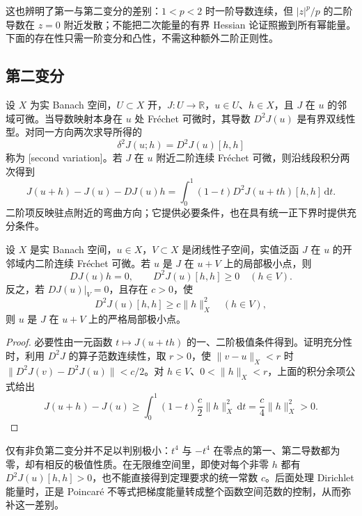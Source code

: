 这也辨明了第一与第二变分的差别：\(1<p<2\) 时一阶导数连续，但 \(|z|^p/p\) 的二阶导数在 \(z=0\) 附近发散；不能把二次能量的有界 Hessian 论证照搬到所有幂能量。下面的存在性只需一阶变分和凸性，不需这种额外二阶正则性。

\subsection{第二变分}
\label{b2:subsec:140104}

设 \(X\) 为实 Banach 空间，\(U\subset X\) 开，\(J:U\to\mathbb R\)，\(u\in U\)、\(h\in X\)，且 \(J\) 在 \(u\) 的邻域可微。当导数映射本身在 \(u\) 处 Fréchet 可微时，其导数 \(D^2J(u)\) 是有界双线性型。对同一方向两次求导所得的
\[\delta^2J(u;h)=D^2J(u)[h,h]\]
称为 [second variation]。若 \(J\) 在 \(u\) 附近二阶连续 Fréchet 可微，则沿线段积分两次得到
\[
 J(u+h)-J(u)-DJ(u)h
 =\int_0^1(1-t)D^2J(u+th)[h,h]\,\mathrm dt.
\]
二阶项反映驻点附近的弯曲方向；它提供必要条件，也在具有统一正下界时提供充分条件。

\begin{theorem}[第二变分判别]
\label{b2:thm:14-second-variation-test}
设 \(X\) 是实 Banach 空间，\(u\in X\)，\(V\subset X\) 是闭线性子空间，实值泛函 \(J\) 在 \(u\) 的开邻域内二阶连续 Fréchet 可微。若 \(u\) 是 \(J\) 在 \(u+V\) 上的局部极小点，则
\[DJ(u)h=0,\qquad D^2J(u)[h,h]\ge0\quad(h\in V).\]
反之，若 \(DJ(u)|_V=0\)，且存在 \(c>0\)，使
\[D^2J(u)[h,h]\ge c\lVert h\rVert_X^2\quad(h\in V),\]
则 \(u\) 是 \(J\) 在 \(u+V\) 上的严格局部极小点。
\end{theorem}
\begin{proof}
必要性由一元函数 \(t\mapsto J(u+th)\) 的一、二阶极值条件得到。证明充分性时，利用 \(D^2J\) 的算子范数连续性，取 \(r>0\)，使 \(\lVert v-u\rVert_X<r\) 时 \(\lVert D^2J(v)-D^2J(u)\rVert<c/2\)。对 \(h\in V\)、\(0<\lVert h\rVert_X<r\)，上面的积分余项公式给出
\[
 J(u+h)-J(u)\ge\int_0^1(1-t)\frac c2\lVert h\rVert_X^2\,\mathrm dt
 =\frac c4\lVert h\rVert_X^2>0.
\]
\end{proof}

仅有非负第二变分并不足以判别极小：\(t^4\) 与 \(-t^4\) 在零点的第一、第二导数都为零，却有相反的极值性质。在无限维空间里，即使对每个非零 \(h\) 都有 \(D^2J(u)[h,h]>0\)，也不能直接得到定理要求的统一常数 \(c\)。后面处理 Dirichlet 能量时，正是 Poincaré 不等式把梯度能量转成整个函数空间范数的控制，从而弥补这一差别。
